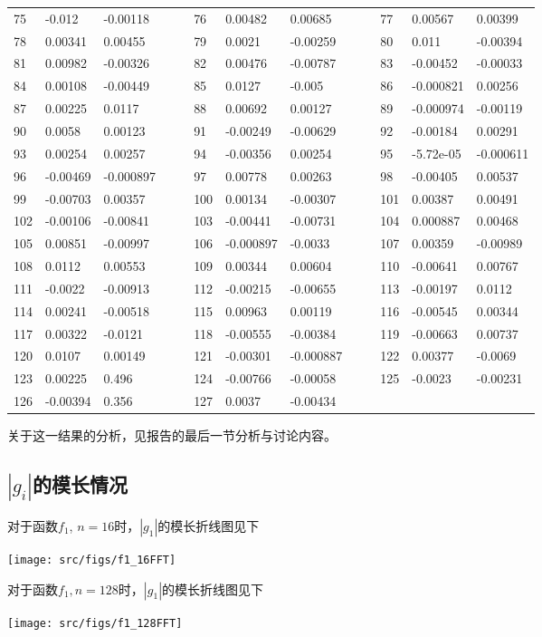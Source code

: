 \documentclass[english]{ctexart}
\providecommand{\tabularnewline}{\\}
\begin{document}
\begin{tabular}{lllllllllllll}
75 & -0.012 & -0.00118 &  &  & 76 & 0.00482 & 0.00685 &  &  & 77 & 0.00567 & 0.00399\tabularnewline
78 & 0.00341 & 0.00455 &  &  & 79 & 0.0021 & -0.00259 &  &  & 80 & 0.011 & -0.00394\tabularnewline
81 & 0.00982 & -0.00326 &  &  & 82 & 0.00476 & -0.00787 &  &  & 83 & -0.00452 & -0.00033\tabularnewline
84 & 0.00108 & -0.00449 &  &  & 85 & 0.0127 & -0.005 &  &  & 86 & -0.000821 & 0.00256\tabularnewline
87 & 0.00225 & 0.0117 &  &  & 88 & 0.00692 & 0.00127 &  &  & 89 & -0.000974 & -0.00119\tabularnewline
90 & 0.0058 & 0.00123 &  &  & 91 & -0.00249 & -0.00629 &  &  & 92 & -0.00184 & 0.00291\tabularnewline
93 & 0.00254 & 0.00257 &  &  & 94 & -0.00356 & 0.00254 &  &  & 95 & -5.72e-05 & -0.000611\tabularnewline
96 & -0.00469 & -0.000897 &  &  & 97 & 0.00778 & 0.00263 &  &  & 98 & -0.00405 & 0.00537\tabularnewline
99 & -0.00703 & 0.00357 &  &  & 100 & 0.00134 & -0.00307 &  &  & 101 & 0.00387 & 0.00491\tabularnewline
102 & -0.00106 & -0.00841 &  &  & 103 & -0.00441 & -0.00731 &  &  & 104 & 0.000887 & 0.00468\tabularnewline
105 & 0.00851 & -0.00997 &  &  & 106 & -0.000897 & -0.0033 &  &  & 107 & 0.00359 & -0.00989\tabularnewline
108 & 0.0112 & 0.00553 &  &  & 109 & 0.00344 & 0.00604 &  &  & 110 & -0.00641 & 0.00767\tabularnewline
111 & -0.0022 & -0.00913 &  &  & 112 & -0.00215 & -0.00655 &  &  & 113 & -0.00197 & 0.0112\tabularnewline
114 & 0.00241 & -0.00518 &  &  & 115 & 0.00963 & 0.00119 &  &  & 116 & -0.00545 & 0.00344\tabularnewline
117 & 0.00322 & -0.0121 &  &  & 118 & -0.00555 & -0.00384 &  &  & 119 & -0.00663 & 0.00737\tabularnewline
120 & 0.0107 & 0.00149 &  &  & 121 & -0.00301 & -0.000887 &  &  & 122 & 0.00377 & -0.0069\tabularnewline
123 & 0.00225 & 0.496 &  &  & 124 & -0.00766 & -0.00058 &  &  & 125 & -0.0023 & -0.00231\tabularnewline
126 & -0.00394 & 0.356 &  &  & 127 & 0.0037 & -0.00434 &  &  &  &  & \tabularnewline
\end{tabular}

关于这一结果的分析，见报告的最后一节分析与讨论内容。

\subsection{$|g_{i}|$的模长情况}

对于函数$f_{1}$, $n=16$时，$|g_{1}|$的模长折线图见下

\texttt{[image: src/figs/f1\_16FFT]}

对于函数$f_{1},$$n=128$时，$|g_{1}|$的模长折线图见下

\texttt{[image: src/figs/f1\_128FFT]}
\end{document}

